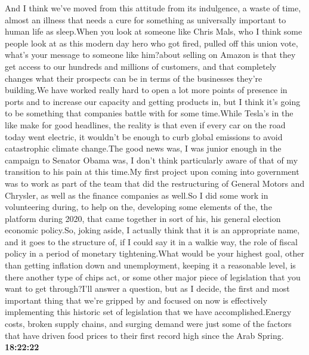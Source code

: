 \documentclass{article}%
\begin{document}
And I think we've moved from this attitude from its indulgence, a waste of time, almost an illness that needs a cure for something as universally important to human life as sleep.When you look at someone like Chris Mals, who I think some people look at as this modern day hero who got fired, pulled off this union vote, what's your message to someone like him?about selling on Amazon is that they get access to our hundreds and millions of customers, and that completely changes what their prospects can be in terms of the businesses they're building.We have worked really hard to open a lot more points of presence in ports and to increase our capacity and getting products in, but I think it's going to be something that companies battle with for some time.While Tesla's in the like make for good headlines, the reality is that even if every car on the road today went electric, it wouldn't be enough to curb global emissions to avoid catastrophic climate change.The good news was, I was junior enough in the campaign to Senator Obama was, I don't think particularly aware of that of my transition to his pain at this time.My first project upon coming into government was to work as part of the team that did the restructuring of General Motors and Chrysler, as well as the finance companies as well.So I did some work in volunteering during, to help on the, developing some elements of the, the platform during 2020, that came together in sort of his, his general election economic policy.So, joking aside, I actually think that it is an appropriate name, and it goes to the structure of, if I could say it in a walkie way, the role of fiscal policy in a period of monetary tightening.What would be your highest goal, other than getting inflation down and unemployment, keeping it a reasonable level, is there another type of chips act, or some other major piece of legislation that you want to get through?I'll answer a question, but as I decide, the first and most important thing that we're gripped by and focused on now is effectively implementing this historic set of legislation that we have accomplished.Energy costs, broken supply chains, and surging demand were just some of the factors that have driven food prices to their first record high since the Arab Spring.%
\textbf{18:22:22}%
\newline%
\end{document}
